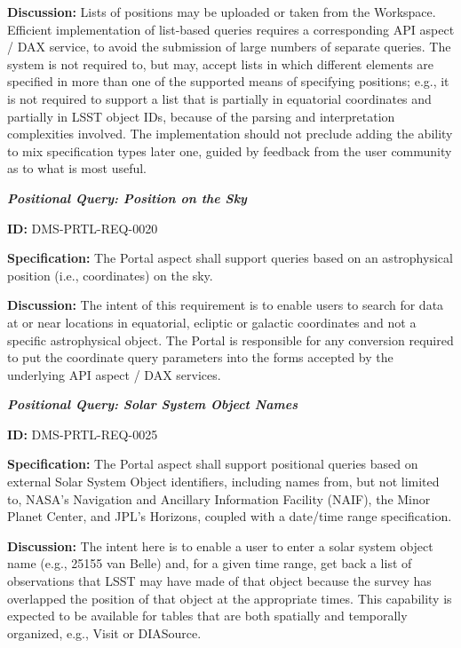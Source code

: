 \documentclass[SE,toc,lsstdraft]{lsstdoc}
\begin{document}
\textbf{Discussion:}
Lists of positions may be uploaded or taken from the Workspace.  Efficient implementation of list-based queries requires a corresponding API aspect / DAX service, to avoid the submission of large numbers of separate queries.
The system is not required to, but may, accept lists in which different elements are specified in more than one of the supported means of specifying positions; e.g., it is not required to support a list that is partially in equatorial coordinates and partially in LSST object IDs, because of the parsing and interpretation complexities involved.  The implementation should not preclude adding the ability to mix specification types later one, guided by feedback from the user community as to what is most useful.

\textbf{\textit{Positional Query: Position on the Sky}}

\label{DMS-PRTL-REQ-0020}
\textbf{ID:} DMS-PRTL-REQ-0020

\textbf{Specification:}
The Portal aspect shall support queries based on an astrophysical position (i.e., coordinates) on the sky.

\textbf{Discussion:}
The intent of this requirement is to enable users to search for data at or near locations in equatorial, ecliptic or galactic coordinates and not a specific astrophysical object.
The Portal is responsible for any conversion required to put the coordinate query parameters into the forms accepted by the underlying API aspect / DAX services.

\textbf{\textit{Positional Query: Solar System Object Names}}

\label{DMS-PRTL-REQ-0025}
\textbf{ID:} DMS-PRTL-REQ-0025

\textbf{Specification:}
The Portal aspect shall support positional queries based on external Solar System Object identifiers, including names from, but not limited to, NASA’s Navigation and Ancillary Information Facility (NAIF), the Minor Planet Center, and JPL’s Horizons, coupled with a date/time range specification.

\textbf{Discussion:}
The intent here is to enable a user to enter a solar system object name (e.g., 25155 van Belle) and, for a given time range, get back a list of observations that LSST may have made of that object because the survey has overlapped the position of that object at the appropriate times.
This capability is expected to be available for tables that are both spatially and temporally organized, e.g., Visit or DIASource.
\end{document}

